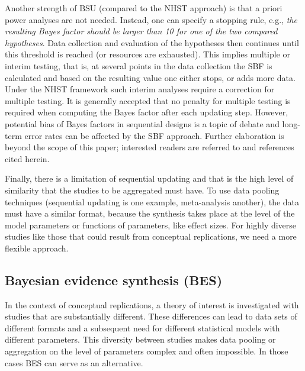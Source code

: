 \documentclass[11pt,reqno]{article}
\begin{document}
Another strength of BSU (compared to the NHST approach) is that a priori power analyses are not needed. Instead, one can specify a stopping rule, e.g., \textit{the resulting Bayes factor should be larger than 10 for one of the two compared hypotheses}. Data collection and evaluation of the hypotheses then continues until this threshold is reached (or resources are exhausted). This implies multiple or interim testing, that is, at several points in the data collection the SBF is calculated and based on the resulting value one either stops, or adds more data. Under the NHST framework such interim analyses require a correction for multiple testing. It is generally accepted that no penalty for multiple testing is required when computing the Bayes factor after each updating step. However, potential bias of Bayes factors in sequential designs is a topic of debate and long-term error rates can be affected by the SBF approach. Further elaboration is beyond the scope of this paper; interested readers are referred to \citet{schonbrodt_sequential_2017} and references cited herein.

Finally, there is a limitation of sequential updating and that is the high level of similarity that the studies to be aggregated must have. To use data pooling techniques (sequential updating is one example, meta-analysis another), the data must have a similar format, because the synthesis takes place at the level of the model parameters or functions of parameters, like effect sizes. For highly diverse studies like those that could result from conceptual replications, we need a more flexible approach.





\subsection{Bayesian evidence synthesis (BES)}

In the context of conceptual replications, a theory of interest is investigated with studies that are substantially different. These differences can lead to data sets of different formats and a subsequent need for different statistical models with different parameters. This diversity between studies makes data pooling or aggregation on the level of parameters complex and often impossible. In those cases BES can serve as an alternative.
\end{document}
